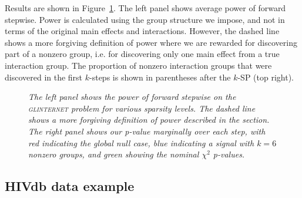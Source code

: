 \documentclass{imsart}
\begin{document}
Results are shown in Figure~\ref{fig:glint}. The left
panel shows average power of forward stepwise. Power is calculated
using the group structure we impose, and not in terms of the original
main effects and interactions. However, the dashed line shows a more
forgiving definition of power where we are rewarded for discovering part
of a nonzero group, i.e. for discovering only one main effect from a
true interaction group. The proportion of nonzero interaction groups
that were discovered in the first $k$-steps is shown in parentheses
after the $k$-SP (top right).

\begin{figure}
\begin{center}
\hspace{-15pt}
\caption{\small \it The left panel shows the power of forward stepwise
on the \textsc{glinternet} problem
for various sparsity levels. The dashed line shows a more forgiving
definition of power described in the section.
The right panel shows our p-value marginally
over each step, with red indicating the global null case, blue
indicating a signal with $k=6$ nonzero groups, and green showing
the nominal $\chi^2$ p-values.}
\label{fig:glint}
\end{center}
\end{figure}



\subsection{HIVdb data example}
\label{sec:hiv}
\end{document}
